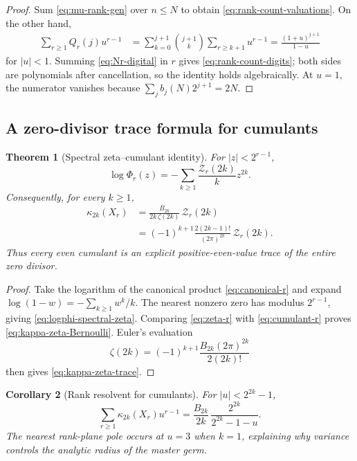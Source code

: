 \documentclass[11pt,a4paper]{article}
\theoremstyle{frontier}
\newtheorem{theorem}{Theorem}[section]
\newtheorem{corollary}[theorem]{Corollary}
\theoremstyle{definition}
\begin{document}
\begin{proof}
Sum \eqref{eq:mu-rank-gen} over $n\le N$ to obtain
\eqref{eq:rank-count-valuations}.  On the other hand,
\begin{align*}
 \sum_{r\ge1}Q_r(j)u^{r-1}
 &=\sum_{k=0}^{j+1}\binom{j+1}{k}
   \sum_{r\ge k+1}u^{r-1}
 =\frac{(1+u)^{j+1}}{1-u}
\end{align*}
for $|u|<1$.  Summing \eqref{eq:Nr-digital} in $r$ gives
\eqref{eq:rank-count-digits}; both sides are polynomials after cancellation, so the identity holds algebraically.  At $u=1$, the numerator vanishes because
$\sum_jb_j(N)2^{j+1}=2N$.
\end{proof}

\subsection{A zero-divisor trace formula for cumulants}

\begin{theorem}[Spectral zeta--cumulant identity]\label{thm:zeta-cumulant}
For $|z|<2^{r-1}$,
\begin{equation}\label{eq:logphi-spectral-zeta}
 \boxed{\quad
 \log\Phi_r(z)=-\sum_{k\ge1}\frac{\mathcal Z_r(2k)}{k}z^{2k}.
 \quad}
\end{equation}
Consequently, for every $k\ge1$,
\begin{align}
 \kappa_{2k}(X_r)
 &=\frac{B_{2k}}{2k\,\zeta(2k)}\,\mathcal Z_r(2k)\label{eq:kappa-zeta-Bernoulli}\\
 &=(-1)^{k+1}\frac{2(2k-1)!}{(2\pi)^{2k}}
   \,\mathcal Z_r(2k).\label{eq:kappa-zeta-trace}
\end{align}
Thus every even cumulant is an explicit positive-even-value trace of the entire zero divisor.
\end{theorem}

\begin{proof}
Take the logarithm of the canonical product \eqref{eq:canonical-r} and expand
$\log(1-w)=-\sum_{k\ge1}w^k/k$.  The nearest nonzero zero has modulus $2^{r-1}$, giving \eqref{eq:logphi-spectral-zeta}.  Comparing \eqref{eq:zeta-r} with \eqref{eq:cumulant-r} proves \eqref{eq:kappa-zeta-Bernoulli}.  Euler's evaluation
\[
 \zeta(2k)=(-1)^{k+1}
 \frac{B_{2k}(2\pi)^{2k}}{2(2k)!}
\]
then gives \eqref{eq:kappa-zeta-trace}.
\end{proof}

\begin{corollary}[Rank resolvent for cumulants]\label{cor:cumulant-rank-resolvent}
For $|u|<2^{2k}-1$,
\begin{equation}\label{eq:cumulant-rank-resolvent}
 \sum_{r\ge1}\kappa_{2k}(X_r)u^{r-1}
 =\frac{B_{2k}}{2k}\,
  \frac{2^{2k}}{2^{2k}-1-u}.
\end{equation}
The nearest rank-plane pole occurs at $u=3$ when $k=1$, explaining why variance controls the analytic radius of the master germ.
\end{corollary}
\end{document}
